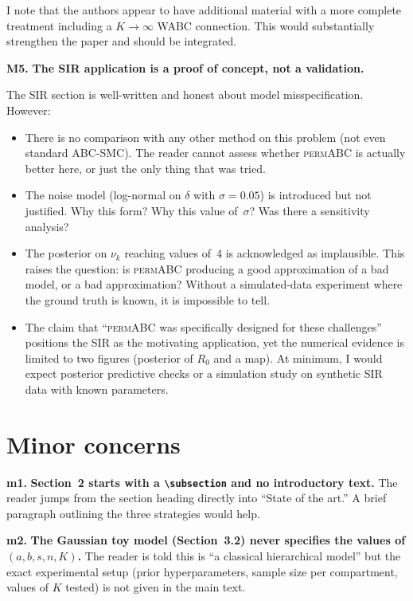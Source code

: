 \documentclass[11pt,a4paper]{article}
\newcommand{\major}[1]{\textbf{\color{red!70!black}M#1.}}
\newcommand{\minor}[1]{\textbf{\color{orange!80!black}m#1.}}
\begin{document}
I note that the authors appear to have additional material with a more complete treatment including a $K \to \infty$ WABC connection. This would substantially strengthen the paper and should be integrated.

\major{5} \textbf{The SIR application is a proof of concept, not a validation.}

The SIR section is well-written and honest about model misspecification. However:
\begin{itemize}[nosep]
    \item There is no comparison with any other method on this problem (not even standard ABC-SMC). The reader cannot assess whether \textsc{permABC} is actually better here, or just the only thing that was tried.
    \item The noise model (log-normal on $\delta$ with $\sigma = 0.05$) is introduced but not justified. Why this form? Why this value of~$\sigma$? Was there a sensitivity analysis?
    \item The posterior on $\nu_k$ reaching values of~4 is acknowledged as implausible. This raises the question: is \textsc{permABC} producing a good approximation of a bad model, or a bad approximation? Without a simulated-data experiment where the ground truth is known, it is impossible to tell.
    \item The claim that ``\textsc{permABC} was specifically designed for these challenges'' positions the SIR as the motivating application, yet the numerical evidence is limited to two figures (posterior of $R_0$ and a map). At minimum, I would expect posterior predictive checks or a simulation study on synthetic SIR data with known parameters.
\end{itemize}

\section*{Minor concerns}

\minor{1} \textbf{Section~2 starts with a \texttt{\textbackslash subsection} and no introductory text.} The reader jumps from the section heading directly into ``State of the art.'' A brief paragraph outlining the three strategies would help.

\minor{2} \textbf{The Gaussian toy model (Section~3.2) never specifies the values of $(a, b, s, n, K)$.} The reader is told this is ``a classical hierarchical model'' but the exact experimental setup (prior hyperparameters, sample size per compartment, values of $K$ tested) is not given in the main text.
\end{document}
